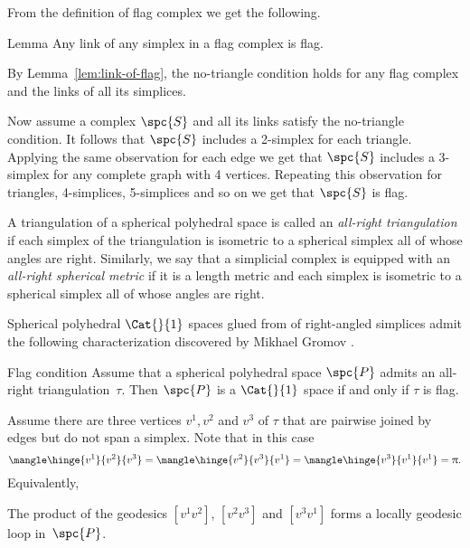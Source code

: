 From the definition of flag complex 
we get the following.

\begin{thm}{Lemma}\label{lem:link-of-flag}
Any link of any simplex in a flag complex is flag.
\end{thm}


By Lemma~\ref{lem:link-of-flag}, the no-triangle condition holds 
for any flag complex and the  links of all its simplices.

Now assume a complex $\spc{S}$ and all its links satisfy 
the no-triangle condition.
It follows that $\spc{S}$ includes a 2-simplex for each triangle.
Applying the same observation for each edge we get that $\spc{S}$ 
includes a 3-simplex for any complete graph with 4 vertices.
Repeating this observation 
for triangles, 
4-simplices,
5-simplices
and so on we get that $\spc{S}$ is flag.
\qeds


A triangulation of a spherical polyhedral space 
is called an  \emph{all-right triangulation} 
if each simplex of the triangulation is isometric 
to a spherical simplex all of whose angles are right.
Similarly, we say that a simplicial complex 
is equipped with an  \emph{all-right spherical metric}
if it is a length metric and each simplex is isometric 
to a spherical simplex all of whose angles are right.

Spherical polyhedral $\Cat{}{1}$ spaces glued from of right-angled simplices
admit the following characterization 
discovered by Mikhael Gromov \cite[p. 122]{gromov:hyp-groups}.

\begin{thm}{Flag condition}\label{thm:flag}
Assume that a spherical polyhedral space $\spc{P}$
admits an all-right triangulation~$\tau$.
Then $\spc{P}$ is a $\Cat{}{1}$ space
if and only if $\tau$ is flag.
\end{thm}

Assume there are three vertices $v^1,v^2$ and $v^3$ of $\tau$
that are pairwise joined by edges 
but do not span a simplex.
Note that in this case 
$$\mangle\hinge{v^1}{v^2}{v^3}=\mangle\hinge{v^2}{v^3}{v^1}=\mangle\hinge{v^3}{v^1}{v^1}=\pi.$$
Equivalently,
\begin{clm}{}\label{clm:3pi/2}
The product
of the geodesics $[v^1v^2]$, $[v^2v^3]$ and $[v^3v^1]$
forms a locally geodesic loop in~$\spc{P}$. 
\end{clm}

